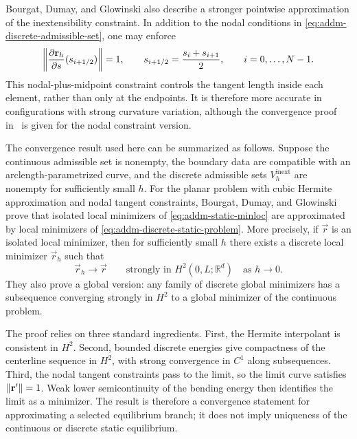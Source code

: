 Bourgat, Dumay, and Glowinski also describe a stronger pointwise approximation
of the inextensibility constraint. In addition to the nodal conditions in
\eqref{eq:addm-discrete-admissible-set}, one may enforce
\begin{equation}\label{eq:addm-discrete-midpoint-constraint}
    \left\lVert \pdv{\mathbf{r}_h}{s}(s_{i+1/2}) \right\rVert = 1,
    \qquad
    s_{i+1/2} = \frac{s_i+s_{i+1}}{2},
    \qquad
    i=0,\ldots,N-1.
\end{equation}
This nodal-plus-midpoint constraint controls the tangent length inside each
element, rather than only at the endpoints. It is therefore more accurate in
configurations with strong curvature variation, although the convergence proof
in~\autocite{glowinski_large_nodate} is given for the nodal constraint version.

The convergence result used here can be summarized as follows. Suppose the
continuous admissible set is nonempty, the boundary data are compatible with an
arclength-parametrized curve, and the discrete admissible sets
\(V_h^{\mathrm{inext}}\) are nonempty for sufficiently small \(h\). For the
planar problem with cubic Hermite approximation and nodal tangent constraints,
Bourgat, Dumay, and Glowinski prove that isolated local minimizers of
\eqref{eq:addm-static-minloc} are approximated by local minimizers of
\eqref{eq:addm-discrete-static-problem}. More precisely, if \(\vec r\) is an
isolated local minimizer, then for sufficiently small \(h\) there exists a
discrete local minimizer \(\vec r_h\) such that
\begin{equation}\label{eq:addm-discrete-local-convergence}
    \vec r_h \to \vec r
    \qquad
    \text{strongly in } H^2(0,L;\mathbb{R}^d)
    \quad \text{as } h \to 0.
\end{equation}
They also prove a global version: any family of discrete global minimizers has a
subsequence converging strongly in \(H^2\) to a global minimizer of the
continuous problem.

The proof relies on three standard ingredients. First, the Hermite interpolant
is consistent in \(H^2\). Second, bounded discrete energies give compactness of
the centerline sequence in \(H^2\), with strong convergence in \(C^1\) along
subsequences. Third, the nodal tangent constraints pass to the limit, so the
limit curve satisfies \(\left\lVert \mathbf{r}' \right\rVert=1\). Weak lower semicontinuity of the
bending energy then identifies the limit as a minimizer. The result is
therefore a convergence statement for approximating a selected equilibrium
branch; it does not imply uniqueness of the continuous or discrete static
equilibrium.

